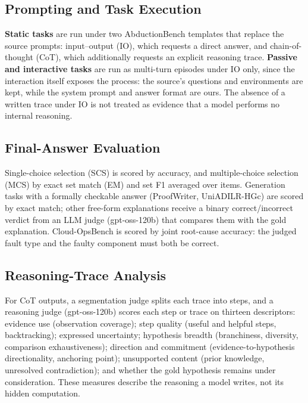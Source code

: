 \subsection{Prompting and Task Execution}
\label{sec:task_execution}

\textbf{Static tasks} are run under two AbductionBench templates that replace the source prompts: input--output (IO), which requests a direct answer, and chain-of-thought (CoT), which additionally requests an explicit reasoning trace. \textbf{Passive and interactive tasks} are run as multi-turn episodes under IO only, since the interaction itself exposes the process: the source's questions and environments are kept, while the system prompt and answer format are ours. The absence of a written trace under IO is not treated as evidence that a model performs no internal reasoning.

\subsection{Final-Answer Evaluation}
\label{sec:outcome_evaluation}
\label{sec:methodology_metrics}

Single-choice selection (SCS) is scored by accuracy, and multiple-choice selection (MCS) by exact set match (EM) and set F1 averaged over items. Generation tasks with a formally checkable answer (ProofWriter, UniADILR-HGc) are scored by exact match; other free-form explanations receive a binary correct/incorrect verdict from an LLM judge (gpt-oss-120b) that compares them with the gold explanation. Cloud-OpsBench is scored by joint root-cause accuracy: the judged fault type and the faulty component must both be correct.

\subsection{Reasoning-Trace Analysis}
\label{sec:reasoning_trace_evaluation}

For CoT outputs, a segmentation judge splits each trace into steps, and a reasoning judge (gpt-oss-120b) scores each step or trace on thirteen descriptors: evidence use (observation coverage); step quality (useful and helpful steps, backtracking); expressed uncertainty; hypothesis breadth (branchiness, diversity, comparison exhaustiveness); direction and commitment (evidence-to-hypothesis directionality, anchoring point); unsupported content (prior knowledge, unresolved contradiction); and whether the gold hypothesis remains under consideration. These measures describe the reasoning a model writes, not its hidden computation.

